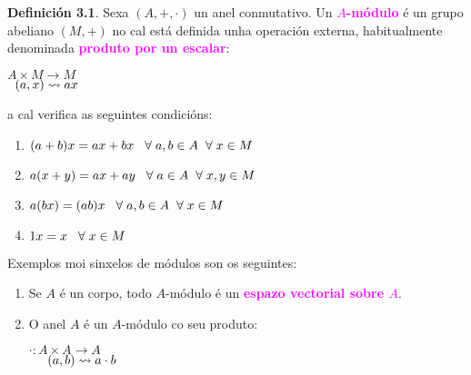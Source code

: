 \documentclass[twoside]{report}
\newcommand{\magbf}[1]{\textcolor{magenta}{\textbf{#1}}} %
\theoremstyle{mystyle}
\begin{document}
\vspace{5mm}

\noindent \textbf{Definición 3.1}. Sexa $(A, +, \cdot)$ un anel conmutativo. Un \magbf{$A$-módulo} é un grupo abeliano $(M, +)$ no cal está definida unha operación externa, habitualmente denominada \magbf{produto por un escalar}:\\

\begin{center}
    $A \times M \longrightarrow M$\\
    \vspace{2mm}
    $\hspace{2mm} (a, x) \leadsto ax$
\end{center}

\noindent a cal verifica as seguintes condicións:

\renewcommand{\theenumi}{\roman{enumi})}
\renewcommand{\labelenumi}{\theenumi}

\begin{enumerate}
    \item $(a + b)x = ax + bx \hspace{3mm} \forall \hspace{1mm} a,b \in A \hspace{2mm} \forall \hspace{1mm} x \in M$
    \item $a(x + y) = ax + ay \hspace{3mm} \forall \hspace{1mm} a \in A \hspace{2mm} \forall \hspace{1mm} x,y \in M$
    \item $a(bx) = (ab)x \hspace{3mm} \forall \hspace{1mm} a,b \in A \hspace{2mm} \forall \hspace{1mm} x \in M$
    \item $1x = x \hspace{3mm} \forall \hspace{1mm} x \in M$
\end{enumerate}

\vspace{3mm}

\noindent Exemplos moi sinxelos de módulos son os seguintes:

\renewcommand{\theenumi}{\arabic{enumi}}
\renewcommand{\labelenumi}{\theenumi.}

\begin{enumerate}
    \item Se $A$ é un corpo, todo $A$-módulo é un \magbf{espazo vectorial sobre $A$}.
    \item O anel $A$ é un $A$-módulo co seu produto:
    \begin{center}
        $\cdot: A \times A \longrightarrow A$\\
        \vspace{2mm}
        $\hspace{5mm} (a,b) \leadsto a \cdot b$
    \end{center}
\end{enumerate}
\end{document}
